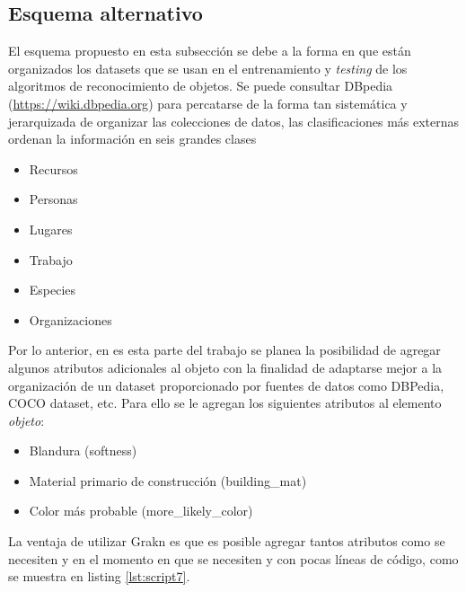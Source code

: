 \subsection{Esquema alternativo} %
\label{sub:esq-alt}
El esquema propuesto en esta subsección se debe a la forma en que están 
organizados los datasets que se usan en el entrenamiento y \textit{testing} 
de los algoritmos de reconocimiento de objetos. Se puede consultar DBpedia
(\url{https://wiki.dbpedia.org}) para percatarse de la forma tan 
sistemática y jerarquizada  de organizar las colecciones de datos, las
clasificaciones más externas ordenan la información en seis grandes clases 
\cite{dbpedia}

\begin{itemize}
    \item Recursos
    \item Personas
    \item Lugares
    \item Trabajo
    \item Especies
    \item Organizaciones
\end{itemize}

Por lo anterior, en es esta parte del trabajo se planea la posibilidad de 
agregar algunos atributos adicionales al objeto con la finalidad de adaptarse 
mejor a la organización de un dataset proporcionado por fuentes de datos como 
DBPedia, COCO dataset, etc. Para ello se le agregan los siguientes atributos 
al elemento \textit{objeto}:

\begin{itemize}
    \item Blandura (softness)
    \item Material primario de construcción (building\_mat)
    \item Color más probable (more\_likely\_color)
\end{itemize}

La ventaja de utilizar Grakn es que es posible agregar tantos atributos como se 
necesiten y en el momento en que se necesiten y con pocas líneas de código, 
como se muestra en 
listing \ref{lst:script7}.




